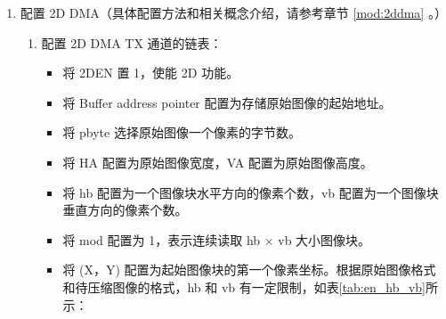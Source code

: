 \documentclass[main\_\_CN.tex]{subfiles}
\begin{document}
\begin{enumerate}
\begin{itemize}
        \item 配置 \hyperref[fielddesc:JPEGSAMPLESEL]{JPEG\_SAMPLE\_SEL} 选择待压缩图像格式：
                \begin{itemize}
                    \item 0：YUV444
                    \item 1：YUV422
                    \item 2：YUV420
                \end{itemize}
        注意：该字段仅在原始图像格式为 RGB 时有效。详见表 \ref{tab:csc_result}。
        \item 将 \hyperref[fielddesc:JPEGHA]{JPEG\_HA} 配置为原始图像宽度，\hyperref[fielddesc:JPEGVA]{JPEG\_VA} 配置为原始图像高度。
        \item 参考章节 \ref{sec:jpegcodec-enc-qnr} 的说明配置量化系数表。
    \end{itemize}
    \item 配置 2D DMA（具体配置方法和相关概念介绍，请参考章节 \ref{mod:2ddma}
    \textit{}。）
    \begin{enumerate}
        \item 配置 2D DMA TX 通道的链表：
        \begin{itemize}
            \item 将 2DEN 置 1，使能 2D 功能。
            \item 将 Buffer address pointer 配置为存储原始图像的起始地址。
            \item 将 pbyte 选择原始图像一个像素的字节数。
            \item 将 HA 配置为原始图像宽度，VA 配置为原始图像高度。
            \item 将 hb 配置为一个图像块水平方向的像素个数，vb 配置为一个图像块垂直方向的像素个数。
            \item 将 mod 配置为 1，表示连续读取 hb × vb 大小图像块。
            \item 将 (X，Y) 配置为起始图像块的第一个像素坐标。根据原始图像格式和待压缩图像的格式，hb 和 vb 有一定限制，如表\ref{tab:en_hb_vb}所示：

\end{itemize}
\end{enumerate}
\end{enumerate}
\end{document}
